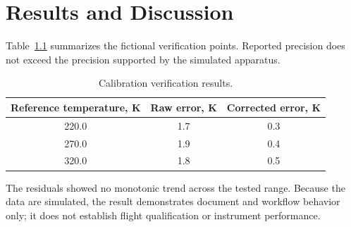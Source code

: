 \chapter{Results and Discussion}
Table~\ref{tab:results} summarizes the fictional verification points. Reported
precision does not exceed the precision supported by the simulated apparatus.

\begin{table}[htbp]
  \centering
  \caption{Calibration verification results.}
  \label{tab:results}
  \begin{tabular}{ccc}
    \hline
    Reference temperature, K & Raw error, K & Corrected error, K \\
    \hline
    220.0 & 1.7 & 0.3 \\
    270.0 & 1.9 & 0.4 \\
    320.0 & 1.8 & 0.5 \\
    \hline
  \end{tabular}
\end{table}

The residuals showed no monotonic trend across the tested range. Because the
data are simulated, the result demonstrates document and workflow behavior only;
it does not establish flight qualification or instrument performance.

